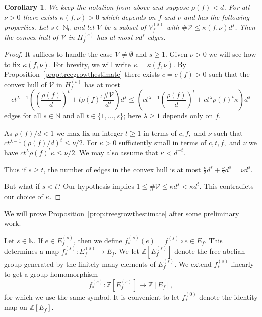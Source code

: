 \documentclass[12pt,oneside,a4]{amsart}
\newcommand{\IN}{\mathbb{N}}
\newcommand{\IZ}{\mathbb{Z}}
\newcommand{\cV}{\mathcal{V}}
\newcounter{maincounter}
\numberwithin{maincounter}{section}
\numberwithin{equation}{section}
\newtheorem{corollary}[maincounter]{Corollary}
\begin{document}
\begin{corollary}
  \label{cor:convexhull}
  We keep the notation from above and suppose $\rho(f)<d$. For all
  $\nu > 0$ there exists $\kappa(f,\nu)>0$ which depends on $f$ and $\nu$ and
  has the following properties. Let $s\in\IN_0$ and let $\cV$ be a subset
  of $V_f^{(s)}$ with $\# \cV \le \kappa(f,\nu) d^s$. Then the convex hull of
  $\cV$ in $H_f^{(s)}$ has at most $\nu d^s$ edges.
\end{corollary}
\begin{proof}
  It suffices to handle the case $\cV\not=\emptyset$ and $s\ge 1$.
  Given $\nu>0$ we will see how to fix $\kappa(f,\nu)$.
  For brevity, we will write $\kappa=\kappa(f,\nu)$.
  By Proposition~\ref{prop:treegrowthestimate} there exists $c=c(f)>0$ such
  that
  the convex hull of $\cV$ in $H_f^{(s)}$ has at most
  \begin{equation*}
    ct^{\lambda-1}\left(
    \left(\frac{\rho(f)}{d}\right)^t + t \rho(f)^t \frac{\#\cV}{d^s} 
  \right)d^s
  \le \left(
    ct^{\lambda-1}\left(\frac{\rho(f)}{d}\right)^t  + ct^{\lambda}
    \rho(f)^t \kappa
  \right)d^s
  \end{equation*}
  edges for all $s\in\IN$ and all $t\in \{1,\ldots,s\}$; here $\lambda
  \ge 1$ depends only on $f$. 

  As $\rho(f)/d<1$ we max fix an integer $t\ge 1$ in terms of $c,f,$ and $\nu$  such that $ct^{\lambda-1}
  (\rho(f)/d)^t \le \nu/2$. For $\kappa>0$ sufficiently small in
  terms of $c,t,f,$ and $\nu$ we have $ct^{\lambda}\rho(f)^t
  \kappa\le\nu/2$.  We may also assume that $\kappa <d^{-t}$. 

  Thus if $s\ge t$, the number of edges in the convex hull is at most
  $\frac{\nu}{2}d^s + \frac{\nu}{2} d^s = \nu d^s$.

  But what if $s<t$? Our hypothesis
  implies $1\le \#\cV\le \kappa d^s<\kappa d^t$. This contradicts our
  choice of $\kappa$.
\end{proof}

We will prove Proposition~\ref{prop:treegrowthestimate} after some
preliminary work.

Let $s\in\IN$. If $e\in E_f^{(s)}$, then we define $f^{(s)}_*(e) =
f^{(s)} \circ e \in E_f$. This determines a map $f^{(s)}_* \colon
E_f^{(s)} \rightarrow E_f$. We let $\IZ[E_f^{(s)}]$ denote the free
abelian group generated by the finitely many elements of $E_f^{(s)}$.
We extend $f^{(s)}_*$ linearly to get  a group homomorphism
\begin{equation*}
  f^{(s)}_* \colon \IZ[E_f^{(s)}]\rightarrow \IZ[E_f],
\end{equation*}
for which we use the same symbol. It is convenient to let $f^{(0)}_*$
denote the identity map on $\IZ[E_f]$. 
\end{document}
